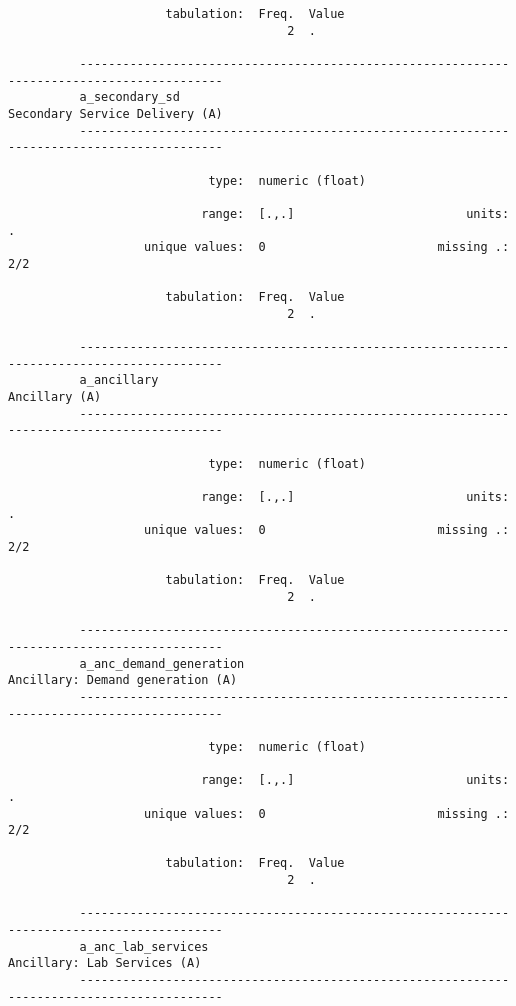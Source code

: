 \documentclass{article}
\begin{document}
\begin{verbatim}
                      tabulation:  Freq.  Value
                                       2  .
          
          ------------------------------------------------------------------------------------------
          a_secondary_sd                                              Secondary Service Delivery (A)
          ------------------------------------------------------------------------------------------
          
                            type:  numeric (float)
          
                           range:  [.,.]                        units:  .
                   unique values:  0                        missing .:  2/2
          
                      tabulation:  Freq.  Value
                                       2  .
          
          ------------------------------------------------------------------------------------------
          a_ancillary                                                                  Ancillary (A)
          ------------------------------------------------------------------------------------------
          
                            type:  numeric (float)
          
                           range:  [.,.]                        units:  .
                   unique values:  0                        missing .:  2/2
          
                      tabulation:  Freq.  Value
                                       2  .
          
          ------------------------------------------------------------------------------------------
          a_anc_demand_generation                                   Ancillary: Demand generation (A)
          ------------------------------------------------------------------------------------------
          
                            type:  numeric (float)
          
                           range:  [.,.]                        units:  .
                   unique values:  0                        missing .:  2/2
          
                      tabulation:  Freq.  Value
                                       2  .
          
          ------------------------------------------------------------------------------------------
          a_anc_lab_services                                             Ancillary: Lab Services (A)
          ------------------------------------------------------------------------------------------
          

\end{verbatim}
\end{document}
